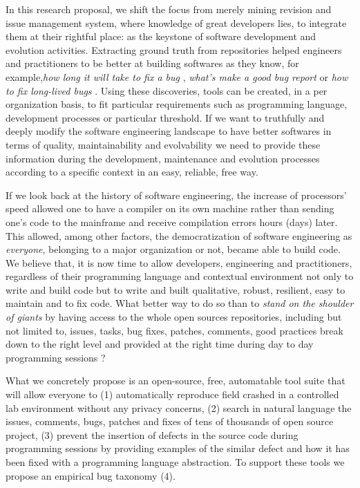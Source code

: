 In this research proposal, we shift the focus from merely mining revision and issue management system, where knowledge of great developers lies, to integrate them at their rightful place: as the keystone of software development and evolution activities.
Extracting ground truth from repositories helped engineers and practitioners to be better at building softwares as they know, for example,{\it how long it will take to fix a bug} \cite{Weiss2007}, {\it what's make a good bug report} \cite{Bettenburg2008} or {\it how to fix long-lived bugs} \cite{Saha2014}.
Using these discoveries, tools can be created, in a per organization basis, to fit particular requirements such as programming language, development processes or particular threshold. If we want to truthfully and deeply modify the software engineering landscape to have better softwares in terms of quality, maintainability and evolvability we need to provide these information during the development, maintenance and evolution processes according to a specific context in an easy, reliable, free way.

If we look back at the history of software engineering, the increase of processors' speed allowed one to have a compiler on its own machine rather than sending one's code to the mainframe and receive compilation errors hours (days) later. This allowed, among other factors, the democratization of software engineering as {\it everyone}, belonging to a major organization or not, became able to build code. We believe that, it is now time to allow developers, engineering and practitioners, regardless of their programming language and contextual environment not only to write and build code but to write and built qualitative, robust, resilient, easy to maintain and to fix code. What better way to do so than to {\it stand on the shoulder of giants} by having access to the whole open sources repositories, including but not limited to, issues, tasks, bug fixes, patches, comments, good practices break down to the right level and provided at the right time during day to day programming sessions ?

What we concretely propose is an open-source, free, automatable tool suite that will allow everyone to (1) automatically reproduce field crashed in a controlled lab environment without any privacy concerns, (2) search in natural language the issues, comments, bugs, patches and fixes of tens of thousands of open source project, (3) prevent the insertion of defects in the source code during programming sessions by providing examples of the similar defect and how it has been fixed with a programming language abstraction. To support these tools we propose an empirical bug taxonomy (4).

